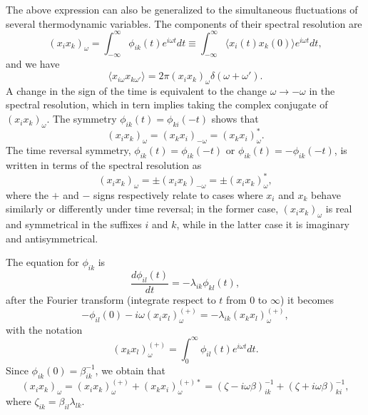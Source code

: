 \documentclass{book}
\newcommand{\average}[1]{\langle#1\rangle}
\numberwithin{equation}{section}
\begin{document}
The above expression can also be generalized to the simultaneous
fluctuations of several thermodynamic variables. The components of
their spectral resolution are
\begin{equation}
  (x_ix_k)_\omega=\int_{-\infty}^{\infty}\phi_{ik}(t)e^{i\omega t}dt\equiv
  \int_{-\infty}^{\infty}\average{x_i(t)x_k(0)}e^{i\omega t}dt,
\end{equation}
and we have 
\begin{equation}
  \average{x_{i\omega}x_{k\omega'}}=2\pi(x_ix_k)_\omega\delta(\omega+\omega').
\end{equation}
A change in the sign of the time is equivalent to the change
$\omega\to-\omega$ in the spectral resolution, which in tern implies
taking the complex conjugate of $(x_ix_k)_\omega$. The symmetry
$\phi_{ik}(t)=\phi_{ki}(-t)$ shows that
\begin{equation}
  (x_ix_k)_\omega=(x_kx_i)_{-\omega}=(x_kx_i)_\omega^*.
\end{equation}
The time reversal symmetry, $\phi_{ik}(t)=\phi_{ik}(-t)$ or
$\phi_{ik}(t)=-\phi_{ik}(-t)$, is written in terms of the spectral
resolution as
\begin{equation}
  (x_ix_k)_\omega=\pm(x_ix_k)_{-\omega}=\pm(x_ix_k)_\omega^*,
\end{equation}
where the $+$ and $-$ signs respectively relate to cases where $x_i$
and $x_k$ behave similarly or differently under time reversal; in the
former case, $(x_ix_k)_\omega$ is real and symmetrical in the suffixes
$i$ and $k$, while in the latter case it is imaginary and
antisymmetrical.

The equation for $\phi_{ik}$ is 
\begin{equation}
  \frac{d\phi_{il}(t)}{dt}=-\lambda_{ik}\phi_{kl}(t),
\end{equation}
after the Fourier transform (integrate respect to $t$ from $0$ to
$\infty$) it becomes
\begin{equation}
  -\phi_{il}(0)-i\omega(x_ix_l)^{(+)}_\omega=-\lambda_{ik}(x_kx_l)^{(+)}_\omega,
\end{equation}
with the notation
\begin{equation}
  (x_kx_l)^{(+)}_\omega=\int_0^\infty\phi_{il}(t)e^{i\omega t}dt.
\end{equation}
Since $\phi_{ik}(0)=\beta^{-1}_{ik}$, we obtain that
\begin{equation}
  (x_ix_k)_\omega=(x_ix_k)^{(+)}_\omega+(x_kx_i)_\omega^{(+)*}=
  (\zeta-i\omega\beta)^{-1}_{ik}+(\zeta+i\omega\beta)^{-1}_{ki},
\end{equation}
where $\zeta_{ik}=\beta_{il}\lambda_{lk}$.
\end{document}
